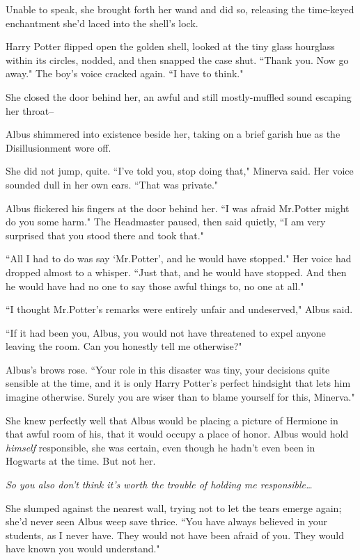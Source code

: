 Unable to speak, she brought forth her wand and did so, releasing the time-keyed enchantment she'd laced into the shell's lock.

Harry Potter flipped open the golden shell, looked at the tiny glass hourglass within its circles, nodded, and then snapped the case shut. ``Thank you. Now go away." The boy's voice cracked again. ``I have to think."

\later

She closed the door behind her, an awful and still mostly-muffled sound escaping her throat\---

Albus shimmered into existence beside her, taking on a brief garish hue as the Disillusionment wore off.

She did not jump, quite. ``I've told you, stop doing that," Minerva said. Her voice sounded dull in her own ears. ``That was private."

Albus flickered his fingers at the door behind her. ``I was afraid Mr.\?Potter might do you some harm." The Headmaster paused, then said quietly, ``I am very surprised that you stood there and took that."

``All I had to do was say `Mr.\?Potter', and he would have stopped." Her voice had dropped almost to a whisper. ``Just that, and he would have stopped. And then he would have had no one to say those awful things to, no one at all."

``I thought Mr.\?Potter's remarks were entirely unfair and undeserved," Albus said.

``If it had been you, Albus, you would not have threatened to expel anyone leaving the room. Can you honestly tell me otherwise?"

Albus's brows rose. ``Your role in this disaster was tiny, your decisions quite sensible at the time, and it is only Harry Potter's perfect hindsight that lets him imagine otherwise. Surely you are wiser than to blame yourself for this, Minerva."

She knew perfectly well that Albus would be placing a picture of Hermione in that awful room of his, that it would occupy a place of honor. Albus would hold \emph{himself} responsible, she was certain, even though he hadn't even been in Hogwarts at the time. But not her.

\emph{So you also don't think it's worth the trouble of holding me responsible{\ldots}}

She slumped against the nearest wall, trying not to let the tears emerge again; she'd never seen Albus weep save thrice. ``You have always believed in your students, as I never have. They would not have been afraid of you. They would have known you would understand."

